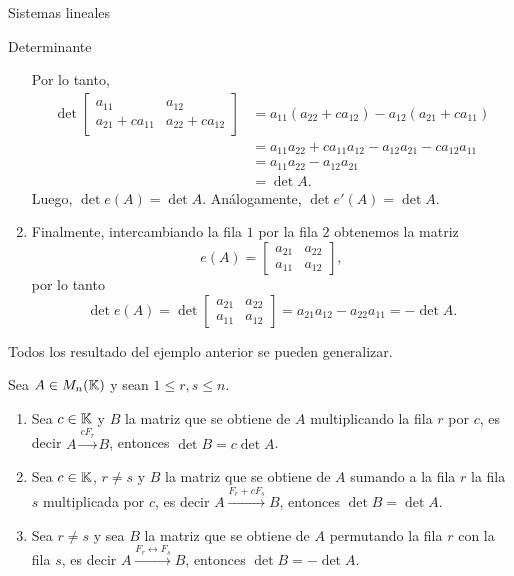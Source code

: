 \begin{chapter}{Sistemas lineales}
\begin{section}{Determinante}
\begin{ejemplo*}
\begin{enumerate}
\begin{equation*}
            \end{equation*}
            Por lo tanto, 
            \begin{align*}
                \det \begin{bmatrix} a_{11}& a_{12}\\ a_{21}+ ca_{11}&a_{22}+ ca_{12}\end{bmatrix} &=
                a_{11}(a_{22}+ ca_{12})- a_{12}( a_{21}+ ca_{11}) \\
                &= a_{11}a_{22}+ ca_{11}a_{12}- a_{12} a_{21}- ca_{12} a_{11}\\
                &= a_{11}a_{22}- a_{12} a_{21} \\
                &= \det A.
            \end{align*}
            Luego,  $\det e(A) = \det A$. Análogamente,   $\det e'(A) = \det A$. 
            \item Finalmente, intercambiando la fila $1$ por la fila $2$ obtenemos la matriz
            \begin{equation*}
            e(A)=\begin{bmatrix} a_{21}& a_{22}\\ a_{11}&a_{12}\end{bmatrix},
            \end{equation*}
            por lo tanto 
            \begin{equation*}
            \det e(A)= \det \begin{bmatrix} a_{21}& a_{22}\\ a_{11}&a_{12}\end{bmatrix} = a_{21}a_{12} - a_{22}a_{11} = -\det A.
            \end{equation*}
        \end{enumerate}
    \end{ejemplo*}
    
    Todos los resultado del ejemplo anterior se pueden generalizar. 
    
    \begin{teorema} \label{det-prop-fundamentales}
        Sea $A  \in M_n(\mathbb K)$ y sean $1 \le r,s \le n$.
        \begin{enumerate}
            \item\label{det-prop-fundamentales-1} Sea $c \in \mathbb K$ y $B$ la matriz que se obtiene de $A$ multiplicando la fila $r$ por $c$, es decir $A  \stackrel{cF_r}{\longrightarrow} B$, entonces $\det B = c \det A$.
            \item \label{det-prop-fundamentales-2} Sea $c \in \mathbb K$, $r \ne s$ y $B$ la matriz que se obtiene de $A$ sumando a la fila $r$ la fila $s$ multiplicada por $c$, es decir  $A  \stackrel{F_r + cF_s}{\longrightarrow} B$, entonces $\det B = \det A$.
            \item\label{det-prop-fundamentales-3} Sea $r \ne s$ y sea $B$ la matriz que se obtiene de $A$ permutando la fila $r$ con la fila $s$, es decir  $A  \stackrel{F_r \leftrightarrow F_s}{\longrightarrow}B$, entonces $\det B = -\det A$.
            

\end{enumerate}
\end{teorema}
\end{section}
\end{chapter}

